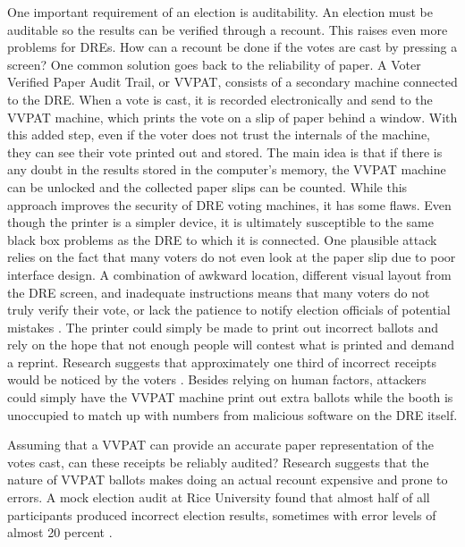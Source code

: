 \documentclass[12pt, titlepage]{article}
\begin{document}
One important requirement of an election is auditability. An election must be auditable so the results can be verified through a recount. This raises even more problems for DREs. How can a recount be done if the votes are cast by pressing a screen? One common solution goes back to the reliability of paper. A Voter Verified Paper Audit Trail, or VVPAT, consists of a secondary machine connected to the DRE. When a vote is cast, it is recorded electronically and send to the VVPAT machine, which prints the vote on a slip of paper behind a window. With this added step, even if the voter does not trust the internals of the machine, they can see their vote printed out and stored. The main idea is that if there is any doubt in the results stored in the computer's memory, the VVPAT machine can be unlocked and the collected paper slips can be counted. While this approach improves the security of DRE voting machines, it has some flaws. Even though the printer is a simpler device, it is ultimately susceptible to the same black box problems as the DRE to which it is connected. One plausible attack relies on the fact that many voters do not even look at the paper slip due to poor interface design. A combination of awkward location, different visual layout from the DRE screen, and inadequate instructions means that many voters do not truly verify their vote, or lack the patience to notify election officials of potential mistakes \cite{selker2004security}. The printer could simply be made to print out incorrect ballots and rely on the hope that not enough people will contest what is printed and demand a reprint. Research suggests that approximately one third of incorrect receipts would be noticed by the voters \cite{selker2004security}. Besides relying on human factors, attackers could simply have the VVPAT machine print out extra ballots while the booth is unoccupied to match up with numbers from malicious software on the DRE itself.

Assuming that a VVPAT can provide an accurate paper representation of the votes cast, can these receipts be reliably audited? Research suggests that the nature of VVPAT ballots makes doing an actual recount expensive and prone to errors. A mock election audit at Rice University found that almost half of all participants produced incorrect election results, sometimes with error levels of almost 20 percent \cite{goggin2007examination}.
\end{document}
